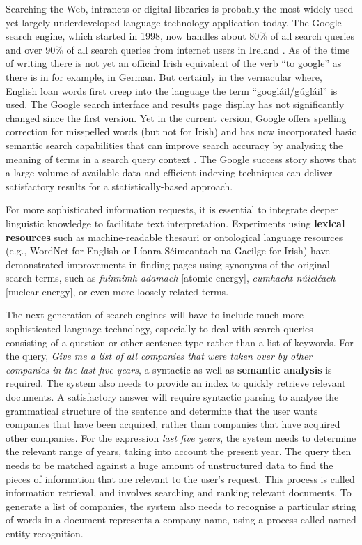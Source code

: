 \begin{multicols}{2}
Searching the Web, intranets or digital libraries is probably the most widely used yet largely underdeveloped language technology application today. The Google search engine, which started in 1998, now handles about 80\% of all search queries and over 90\% of all search queries from internet users in Ireland \cite{googlemarketshare}. As of the time of writing there is not yet an official Irish equivalent of the verb ``to google'' as there is in for example, in German. But certainly in the vernacular where, English loan words first creep into the language the term ``googláil/gúgláil'' \cite{kilgarriff2010} is used. The Google search interface and results page display has not significantly changed since the first version. Yet in the current version, Google offers spelling correction for misspelled words (but not for Irish) and has now incorporated basic semantic search capabilities that can improve search accuracy by analysing the meaning of terms in a search query context \cite{googlesemsearch}.  The Google success story shows that a large volume of available data and efficient indexing techniques can deliver satisfactory results for a statistically-based approach. 

For more sophisticated information requests, it is essential to integrate deeper linguistic knowledge to facilitate text interpretation. Experiments using \textbf{lexical resources} such as machine-readable thesauri or ontological language resources (e.g., WordNet for English or Líonra Séimeantach na Gaeilge for Irish) have demonstrated improvements in finding pages using synonyms of the original search terms, such as \textit{fuinnimh adamach} [atomic energy], \textit{cumhacht núicléach} [nuclear energy], or even more loosely related terms. 

The next generation of search engines will have to include much more sophisticated language technology, especially to deal with search queries consisting of a question or other sentence type rather than a list of keywords. For the query, \textit{Give me a list of all companies that were taken over by other companies in the last five years}, a syntactic as well as \textbf{semantic analysis} is required. The system also needs to provide an index to quickly retrieve relevant documents. A satisfactory answer will require syntactic parsing to analyse the grammatical structure of the sentence and determine that the user wants companies that have been acquired, rather than companies that have acquired other companies. For the expression \textit{last five years}, the system needs to determine the relevant range of years, taking into account the present year. The query then needs to be matched against a huge amount of unstructured data to find the pieces of information that are relevant to the user's request. This process is called information retrieval, and involves searching and ranking relevant documents. To generate a list of companies, the system also needs to recognise a particular string of words in a document represents a company name, using a process called named entity recognition.


\end{multicols}
